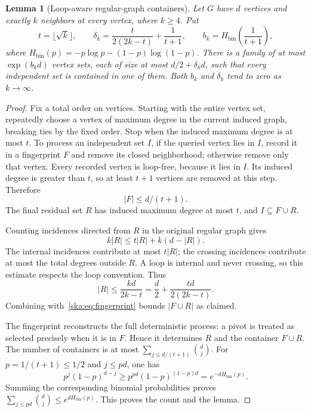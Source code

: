 \documentclass[11pt,letterpaper]{article}
\newtheorem{lemma}[theorem]{Lemma}
\theoremstyle{definition}
\newcommand{\Hbin}{H_{\mathrm{bin}}}
\begin{document}
\begin{lemma}[Loop-aware regular-graph containers]\label{ska:lem:containers}
Let $G$ have $d$ vertices and exactly $k$ neighbors at every vertex, where $k\ge4$. Put
\begin{equation}\label{ska:eq:containerconstants}
t=\lfloor\sqrt{k}\rfloor,\qquad
\delta_k=\frac{t}{2(2k-t)}+\frac1{t+1},\qquad
b_k=\Hbin\left(\frac1{t+1}\right),
\end{equation}
where $\Hbin(p)=-p\log p-(1-p)\log(1-p)$. There is a family of at most $\exp(b_kd)$ vertex sets, each of size at most $d/2+\delta_kd$, such that every independent set is contained in one of them. Both $b_k$ and $\delta_k$ tend to zero as $k\to\infty$.
\end{lemma}
\begin{proof}
Fix a total order on vertices. Starting with the entire vertex set, repeatedly choose a vertex of maximum degree in the current induced graph, breaking ties by the fixed order. Stop when the induced maximum degree is at most $t$. To process an independent set $I$, if the queried vertex lies in $I$, record it in a fingerprint $F$ and remove its closed neighborhood; otherwise remove only that vertex. Every recorded vertex is loop-free, because it lies in $I$. Its induced degree is greater than $t$, so at least $t+1$ vertices are removed at this step. Therefore
\begin{equation}\label{ska:eq:fingerprint}
|F|\le d/(t+1).
\end{equation}
The final residual set $R$ has induced maximum degree at most $t$, and $I\subseteq F\cup R$.

Counting incidences directed from $R$ in the original regular graph gives
\[
k|R|\le t|R|+k(d-|R|).
\]
The internal incidences contribute at most $t|R|$; the crossing incidences contribute at most the total degrees outside $R$. A loop is internal and never crossing, so this estimate respects the loop convention. Thus
\[
|R|\le\frac{kd}{2k-t}
=\frac d2+\frac{t d}{2(2k-t)}.
\]
Combining with~\eqref{ska:eq:fingerprint} bounds $|F\cup R|$ as claimed.

The fingerprint reconstructs the full deterministic process: a pivot is treated as selected precisely when it is in $F$. Hence it determines $R$ and the container $F\cup R$. The number of containers is at most $\sum_{j\le d/(t+1)}\binom dj$. For $p=1/(t+1)\le1/2$ and $j\le pd$, one has
\[
p^j(1-p)^{d-j}\ge p^{pd}(1-p)^{(1-p)d}=e^{-d\Hbin(p)}.
\]
Summing the corresponding binomial probabilities proves
$\sum_{j\le pd}\binom dj\le e^{d\Hbin(p)}$. This proves the count and the lemma.
\end{proof}
\end{document}
